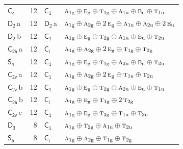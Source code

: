 \documentclass[10pt,a4paper]{article}
\numberwithin{equation}{section}
\newcommand{\grp}[1]{\mathsf{#1}}
\newcommand{\irr}[1]{\text{\normalfont\scshape #1}}
\newcommand{\ptag}[1]{\mathrm{#1}}
\newcommand{\clsletter}[1]{\,{\scriptsize\color{black!55}#1}}
\newlength{\fillwidth}\newlength{\cellwidth}\newlength{\colwidth}
\begin{document}
{\begin{longtable}{@{}lrl>{\RaggedRight\arraybackslash}p{\fillwidth}@{}}
\href{C4.pdf}{$\grp{C_{4}}$} & 12 & \href{C1.pdf}{$\grp{C_{1}}$} & $\irr{a}_{1\ptag{g}}\oplus \irr{e}_{\ptag{g}}\oplus \irr{t}_{1\ptag{g}}\oplus \irr{a}_{1\ptag{u}}\oplus \irr{e}_{\ptag{u}}\oplus \irr{t}_{1\ptag{u}}$\\
\href{D2.pdf}{$\grp{D_{2}}$}\clsletter{a} & 12 & \href{D2.pdf}{$\grp{D_{2}}$}\clsletter{a} & $\irr{a}_{1\ptag{g}}\oplus \irr{a}_{2\ptag{g}}\oplus 2\,\irr{e}_{\ptag{g}}\oplus \irr{a}_{1\ptag{u}}\oplus \irr{a}_{2\ptag{u}}\oplus 2\,\irr{e}_{\ptag{u}}$\\
\href{D2.pdf}{$\grp{D_{2}}$}\clsletter{b} & 12 & \href{C1.pdf}{$\grp{C_{1}}$} & $\irr{a}_{1\ptag{g}}\oplus \irr{e}_{\ptag{g}}\oplus \irr{t}_{2\ptag{g}}\oplus \irr{a}_{1\ptag{u}}\oplus \irr{e}_{\ptag{u}}\oplus \irr{t}_{2\ptag{u}}$\\
\href{C2h.pdf}{$\grp{C_{2h}}$}\clsletter{a} & 12 & \href{S2.pdf}{$\grp{C_{i}}$} & $\irr{a}_{1\ptag{g}}\oplus \irr{a}_{2\ptag{g}}\oplus 2\,\irr{e}_{\ptag{g}}\oplus \irr{t}_{1\ptag{g}}\oplus \irr{t}_{2\ptag{g}}$\\
\href{S4.pdf}{$\grp{S_{4}}$} & 12 & \href{C1.pdf}{$\grp{C_{1}}$} & $\irr{a}_{1\ptag{g}}\oplus \irr{e}_{\ptag{g}}\oplus \irr{t}_{1\ptag{g}}\oplus \irr{a}_{2\ptag{u}}\oplus \irr{e}_{\ptag{u}}\oplus \irr{t}_{2\ptag{u}}$\\
\href{C2v.pdf}{$\grp{C_{2v}}$}\clsletter{a} & 12 & \href{C1.pdf}{$\grp{C_{1}}$} & $\irr{a}_{1\ptag{g}}\oplus \irr{a}_{2\ptag{g}}\oplus 2\,\irr{e}_{\ptag{g}}\oplus \irr{t}_{1\ptag{u}}\oplus \irr{t}_{2\ptag{u}}$\\
\href{C2v.pdf}{$\grp{C_{2v}}$}\clsletter{b} & 12 & \href{C1.pdf}{$\grp{C_{1}}$} & $\irr{a}_{1\ptag{g}}\oplus \irr{e}_{\ptag{g}}\oplus \irr{t}_{2\ptag{g}}\oplus \irr{a}_{2\ptag{u}}\oplus \irr{e}_{\ptag{u}}\oplus \irr{t}_{1\ptag{u}}$\\
\href{C2h.pdf}{$\grp{C_{2h}}$}\clsletter{b} & 12 & \href{S2.pdf}{$\grp{C_{i}}$} & $\irr{a}_{1\ptag{g}}\oplus \irr{e}_{\ptag{g}}\oplus \irr{t}_{1\ptag{g}}\oplus 2\,\irr{t}_{2\ptag{g}}$\\
\href{C2v.pdf}{$\grp{C_{2v}}$}\clsletter{c} & 12 & \href{C1.pdf}{$\grp{C_{1}}$} & $\irr{a}_{1\ptag{g}}\oplus \irr{e}_{\ptag{g}}\oplus \irr{t}_{2\ptag{g}}\oplus \irr{t}_{1\ptag{u}}\oplus \irr{t}_{2\ptag{u}}$\\
\href{D3.pdf}{$\grp{D_{3}}$} & 8 & \href{C1.pdf}{$\grp{C_{1}}$} & $\irr{a}_{1\ptag{g}}\oplus \irr{t}_{2\ptag{g}}\oplus \irr{a}_{1\ptag{u}}\oplus \irr{t}_{2\ptag{u}}$\\
\href{S6.pdf}{$\grp{S_{6}}$} & 8 & \href{S2.pdf}{$\grp{C_{i}}$} & $\irr{a}_{1\ptag{g}}\oplus \irr{a}_{2\ptag{g}}\oplus \irr{t}_{1\ptag{g}}\oplus \irr{t}_{2\ptag{g}}$\\

\end{longtable}}
\end{document}
